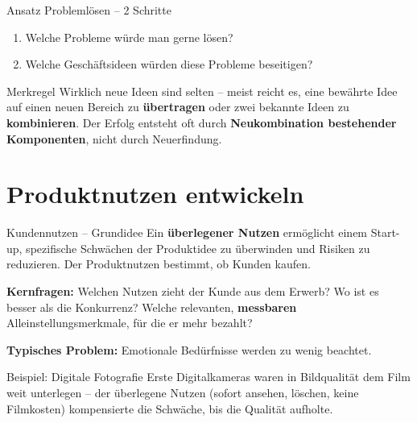 \documentclass[a4paper, fontsize=7pt]{scrartcl}
\begin{document}
\begin{subbox}{Ansatz Problemlösen -- 2 Schritte}
\begin{enumerate}
    \item Welche Probleme würde man gerne lösen?
    \item Welche Geschäftsideen würden diese Probleme beseitigen?
\end{enumerate}
\end{subbox}

\begin{subbox}{Merkregel}
Wirklich neue Ideen sind selten -- meist reicht es, eine bewährte Idee auf einen
neuen Bereich zu \textbf{übertragen} oder zwei bekannte Ideen zu
\textbf{kombinieren}. Der Erfolg entsteht oft durch \textbf{Neukombination
bestehender Komponenten}, nicht durch Neuerfindung.
\end{subbox}

\section{Produktnutzen entwickeln}

\begin{mainbox}{Kundennutzen -- Grundidee}
Ein \textbf{überlegener Nutzen} ermöglicht einem Start-up, spezifische Schwächen
der Produktidee zu überwinden und Risiken zu reduzieren. Der Produktnutzen
bestimmt, ob Kunden kaufen.

\textbf{Kernfragen:} Welchen Nutzen zieht der Kunde aus dem Erwerb? Wo ist es
besser als die Konkurrenz? Welche relevanten, \textbf{messbaren}
Alleinstellungsmerkmale, für die er mehr bezahlt?

\textbf{Typisches Problem:} Emotionale Bedürfnisse werden zu wenig beachtet.
\end{mainbox}

\begin{subbox}{Beispiel: Digitale Fotografie}
Erste Digitalkameras waren in Bildqualität dem Film weit unterlegen -- der
überlegene Nutzen (sofort ansehen, löschen, keine Filmkosten) kompensierte die
Schwäche, bis die Qualität aufholte.
\end{subbox}
\end{document}
